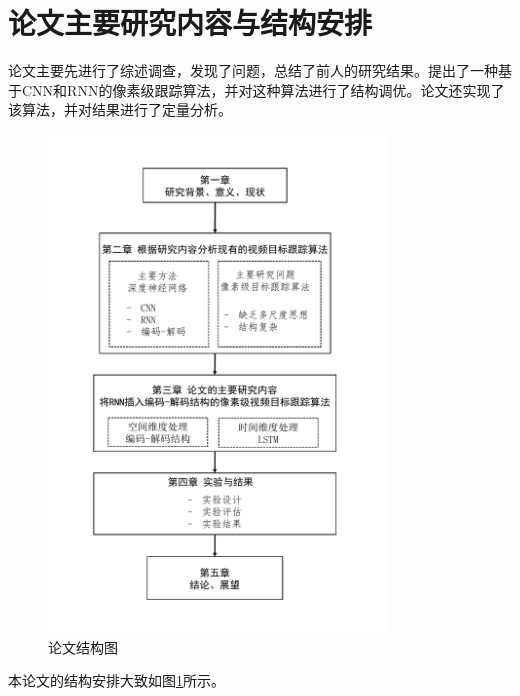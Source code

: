 \newpage
\section{论文主要研究内容与结构安排}
论文主要先进行了综述调查，发现了问题，总结了前人的研究结果。提出了一种基于CNN和RNN的像素级跟踪算法，并对这种算法进行了结构调优。论文还实现了该算法，并对结果进行了定量分析。

\begin{figure}[htbp!]
    \centering
    \includegraphics[width = 0.8\textwidth]{chap/img/thesis_structure.pdf}
    \caption{
        论文结构图
        }\label{fig:thesis_structure2}
\end{figure}
\par
本论文的结构安排大致如图\ref{fig:thesis_structure2}所示。